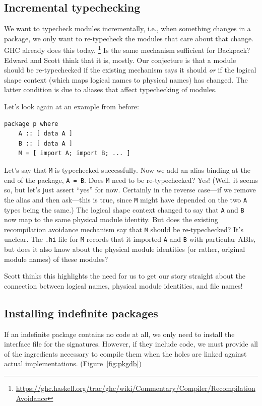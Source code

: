 \documentclass{article}
\begin{document}
\subsection{Incremental typechecking}
We want to typecheck modules incrementally, i.e., when something changes in
a package, we only want to re-typecheck the modules that care about that
change. GHC already does this today.%
\footnote{\url{https://ghc.haskell.org/trac/ghc/wiki/Commentary/Compiler/RecompilationAvoidance}}
Is the same mechanism sufficient for Backpack? Edward and Scott think that it
is, mostly. Our conjecture is that a module should be re-typechecked if the
existing mechanism says it should \emph{or} if the logical shape
context (which maps logical names to physical names) has changed. The latter
condition is due to aliases that affect typechecking of modules.

Let's look again at an example from before:
\begin{verbatim}
package p where
    A :: [ data A ]
    B :: [ data A ]
    M = [ import A; import B; ... ]
\end{verbatim}
Let's say that \verb|M| is typechecked successfully. Now we add an alias binding
at the end of the package, \verb|A = B|. Does \verb|M| need to be
re-typechecked? Yes! (Well, it seems so, but let's just assert ``yes'' for now.
Certainly in the reverse case---if we remove the alias and then ask---this
is true, since \verb|M| might have depended on the two \verb|A| types
being the same.)
The logical shape context changed to say that \verb|A| and
\verb|B| now map to the same physical module identity. But does the existing
recompilation avoidance mechanism say that \verb|M| should be re-typechecked?
It's unclear. The \verb|.hi| file for \verb|M| records that it imported \verb|A| and
\verb|B| with particular ABIs, but does it also know about the physical module
identities (or rather, original module names) of these modules?

Scott thinks this highlights the need for us to get our story straight about
the connection between logical names, physical module identities, and file
names!


\subsection{Installing indefinite packages}\label{sec:installing-indefinite}

If an indefinite package contains no code at all, we only need
to install the interface file for the signatures.  However, if
they include code, we must provide all of the
ingredients necessary to compile them when the holes are linked against
actual implementations.  (Figure~\ref{fig:pkgdb})
\end{document}
